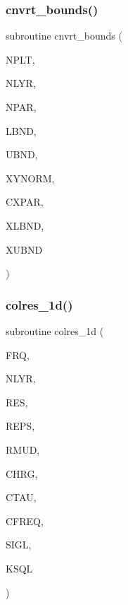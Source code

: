 \subsubsection{\texorpdfstring{cnvrt\+\_\+bounds()}{cnvrt\_bounds()}}
{\footnotesize\ttfamily subroutine cnvrt\+\_\+bounds (\begin{DoxyParamCaption}\item[{integer}]{N\+P\+LT,  }\item[{integer}]{N\+L\+YR,  }\item[{integer}]{N\+P\+AR,  }\item[{real, dimension(npar)}]{L\+B\+ND,  }\item[{real, dimension(npar)}]{U\+B\+ND,  }\item[{real, dimension(nplt)}]{X\+Y\+N\+O\+RM,  }\item[{integer, dimension(npar)}]{C\+X\+P\+AR,  }\item[{real, dimension(npar)}]{X\+L\+B\+ND,  }\item[{real, dimension(npar)}]{X\+U\+B\+ND }\end{DoxyParamCaption})}

\mbox{\label{Leroi__c_8f90_a36d9dbba0b5eada45705f561c0035c54}} 
\subsubsection{\texorpdfstring{colres\+\_\+1d()}{colres\_1d()}}
{\footnotesize\ttfamily subroutine colres\+\_\+1d (\begin{DoxyParamCaption}\item[{real}]{F\+RQ,  }\item[{integer}]{N\+L\+YR,  }\item[{real, dimension(nlyr)}]{R\+ES,  }\item[{real, dimension(nlyr)}]{R\+E\+PS,  }\item[{real(kind=ql), dimension(0\+:nlyr)}]{R\+M\+UD,  }\item[{real, dimension(nlyr)}]{C\+H\+RG,  }\item[{real, dimension(nlyr)}]{C\+T\+AU,  }\item[{real, dimension(nlyr)}]{C\+F\+R\+EQ,  }\item[{complex(kind=ql), dimension (nlyr)}]{S\+I\+GL,  }\item[{complex(kind=ql), dimension (nlyr)}]{K\+S\+QL }\end{DoxyParamCaption})}

